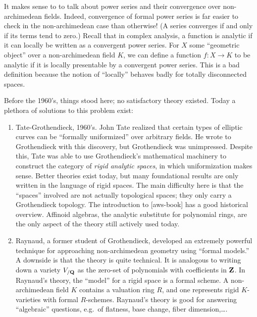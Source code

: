 \documentclass[oneside]{article}
\begin{document}
It makes sense to to talk about power series and their convergence over 
non-archimedean fields. Indeed, convergence of formal power series is far 
easier to check in the non-archimedean case than otherwise! (A series converges 
if and only if its terms tend to zero.) Recall that in complex analysis, 
a function is analytic if it can locally be written as a convergent power 
series. For $X$ some ``geometric object'' over a non-archimedean field $K$, we 
can define a function $f\colon X\to K$ to be analytic if it is 
locally presentable by a convergent power series. This is a bad definition 
because the notion of ``locally'' behaves badly for totally disconnected 
spaces. 

Before the 1960's, things stood here; no satisfactory theory existed. Today 
a plethora of solutions to this problem exist:
\begin{enumerate}
\item Tate-Grothendieck, 1960's. John Tate realized that certain types of elliptic 
    curves can be ``formally uniformized'' over arbitrary fields. He wrote to 
    Grothendieck with this discovery, but Grothendieck was unimpressed. Despite 
    this, Tate was able to use Grothendieck's mathematical machinery to 
    construct the category of \emph{rigid analytic spaces}, in which uniformization 
    makes sense. Better theories 
    exist today, but many foundational results are only written in the language 
    of rigid spaces. The main difficulty here is that the ``spaces'' involved 
    are not actually topological spaces; they only carry a Grothendieck
    topology. The introduction to [aws-book] has a good historical 
    overview. Affinoid algebras, the analytic substitute for polynomial rings, 
    are the only aspect of the theory still actively used today. 

\item Raynaud, a former student of Grothendieck, developed an extremely 
    powerful technique for approaching non-archimedean geometry using ``formal 
    models.'' A downside is that the theory is quite technical. It is analogous 
    to writing down a variety $V_{/\mathbf{Q}}$ as the zero-set of polynomials with 
    coefficients in $\mathbf{Z}$. In Raynaud's theory, the ``model'' for a rigid 
    space is a formal scheme. A non-archimedean field $K$ contains a 
    valuation ring $R$, and one represents rigid $K$-varieties with formal 
    $R$-schemes. Raynaud's theory is good for answering ``algebraic'' 
    questions, e.g.~of flatness, base change, fiber dimension,\ldots. 


\end{enumerate}
\end{document}
